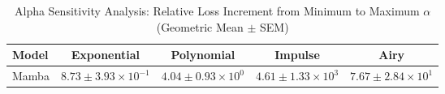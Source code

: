 
\begin{table}[h]
\centering
\caption{Alpha Sensitivity Analysis: Relative Loss Increment from Minimum to Maximum $\alpha$ (Geometric Mean $\pm$ SEM)}
\label{tab:alpha_sensitivity}
\begin{tabular}{lcccc}
\hline
Model & Exponential & Polynomial & Impulse & Airy \\
\hline
Mamba & $8.73 \pm 3.93 \times 10^{-1}$ & $4.04 \pm 0.93 \times 10^{0}$ & $4.61 \pm 1.33 \times 10^{3}$ & $7.67 \pm 2.84 \times 10^{1}$ \\
\hline
\end{tabular}
\end{table}

